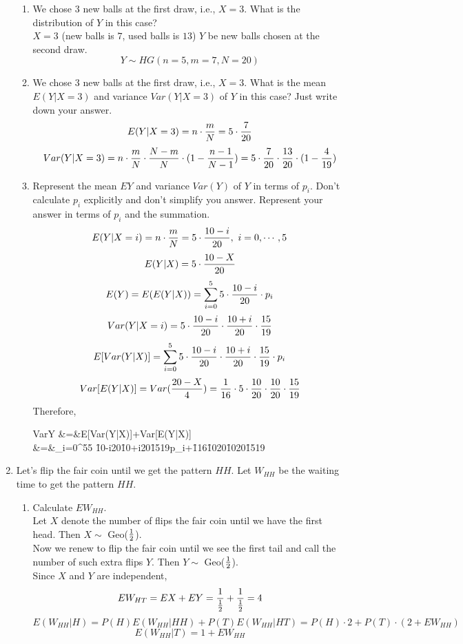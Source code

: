 \documentclass[12pt]{article}%
\newcommand{\0}{{\bf 0}}
\begin{document}
\begin{enumerate}
\begin{enumerate}
\item
We chose $3$ new balls at the first draw, i.e., $X=3$. 
What is the distribution of $Y$ in this case?
\\
{\color{blue}{\bf Sol.}}
$X=3$ (new balls is $7$, used balls is $13$)
$Y$ be new balls chosen at the second draw.\\
$$Y \sim HG(n=5,m=7,N=20)$$

\item
We chose $3$ new balls at the first draw, i.e., $X=3$. 
What is the mean $E(Y|X=3)$ and variance $Var(Y|X=3)$ of $Y$ in this case?
Just write down your answer. 
\\
{\color{blue}{\bf Sol.}}
$$E(Y|X=3)=n\cdot\frac{m}{N}=5\cdot\frac{7}{20}$$ 
$$Var(Y|X=3)=n\cdot\frac{m}{N}\cdot\frac{N-m}{N}\cdot(1-\frac{n-1}{N-1})=5\cdot\frac{7}{20}\cdot\frac{13}{20}\cdot(1-\frac{4}{19})$$


\item
Represent the mean $EY$ and variance $Var(Y)$ of $Y$ in terms of $p_i$. 
Don't calculate $p_i$ explicitly and don't simplify you answer.
Represent your answer in terms of $p_i$ and the summation. 
\\
{\color{blue}{\bf Sol.}}
$$E(Y|X=i)=n\cdot\frac{m}{N}=5\cdot\frac{10-i}{20},~ i=0,\cdots,5$$ 
$$E(Y|X)=5\cdot\frac{10-X}{20}$$ 
$$E(Y)=E(E(Y|X))=\sum_{i=0}^5 5 \cdot \frac{10-i}{20} \cdot p_i$$ 
$$Var(Y|X=i)=5 \cdot \frac{10-i}{20}\cdot \frac{10+i}{20}\cdot \frac{15}{19}$$ 
$$E[Var(Y|X)]=\sum_{i=0}^5 5 \cdot \frac{10-i}{20}\cdot \frac{10+i}{20}\cdot \frac{15}{19}\cdot p_i$$ 
$$Var[E(Y|X)]=Var(\frac{20-X}{4})=\frac{1}{16}\cdot 5\cdot \frac{10}{20}\cdot \frac{10}{20}\cdot \frac{15}{19}$$
Therefore,

\bea
VarY
&=&E[Var(Y|X)]+Var[E(Y|X)]\nn\\
&=&\sum_{i=0}^55 \cdot \f{10-i}{20}\cdot \f{10+i}{20}\cdot \f{15}{19}\cdot p_i+\f{1}{16}\cdot \f{10}{20}\cdot \f{10}{20}\cdot \f{15}{19} \nn
\eea


\end{enumerate}



\item
Let's flip the fair coin until we get the pattern $HH$.
Let $W_{HH}$ be the waiting time to get the pattern $HH$.
\begin{enumerate}
\item
Calculate $EW_{HH}$. 
\\
{\color{blue}{\bf Sol.}}
Let $X$ denote the number of flips the fair coin until we have the first head.
Then $X \sim $ Geo($\frac{1}{2}$).\\
Now we renew to flip the fair coin until we see the first tail and call the number of such extra flips $Y$. Then $Y \sim $ Geo($\frac{1}{2}$).\\
Since $X$ and $Y$ are independent,
$$EW_{HT}=EX+EY=\frac{1}{\frac{1}{2}}+\frac{1}{\frac{1}{2}}=4$$
$$E(W_{HH}|H)=P(H)E(W_{HH}|HH)+P(T)E(W_{HH}|HT)=P(H)\cdot2+P(T)\cdot(2+EW_{HH})$$
$$E(W_{HH}|T)=1+EW_{HH}$$


\end{enumerate}
\end{enumerate}
\end{document}
